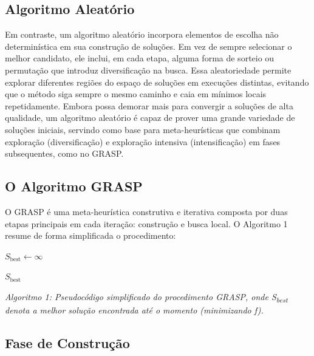 \documentclass[a4paper, 12pt]{article}
\begin{document}
\subsection{Algoritmo Aleatório}

Em contraste, um algoritmo aleatório incorpora elementos de escolha não determinística em sua construção de soluções. Em vez de sempre selecionar o melhor candidato, ele inclui, em cada etapa, alguma forma de sorteio ou permutação que introduz diversificação na busca. Essa aleatoriedade permite explorar diferentes regiões do espaço de soluções em execuções distintas, evitando que o método siga sempre o mesmo caminho e caia em mínimos locais repetidamente. Embora possa demorar mais para convergir a soluções de alta qualidade, um algoritmo aleatório é capaz de prover uma grande variedade de soluções iniciais, servindo como base para meta-heurísticas que combinam exploração (diversificação) e exploração intensiva (intensificação) em fases subsequentes, como no GRASP.


\subsection{O Algoritmo GRASP}

O GRASP é uma meta-heurística construtiva e iterativa composta por duas etapas principais em cada iteração: construção e busca local. O Algoritmo 1 resume de forma simplificada o procedimento:

\begin{algorithm}[H]
\caption{Pseudocódigo GRASP}
\label{alg:grasp}
\DontPrintSemicolon

$S_{\text{best}} \leftarrow \infty$\;

\Return $S_{\text{best}}$

\BlankLine


\end{algorithm}

\textit{Algoritmo 1: Pseudocódigo simplificado do procedimento GRASP, onde S\textsubscript{best} denota a melhor solução encontrada até o momento (minimizando f).}

\subsection{Fase de Construção}
\end{document}
